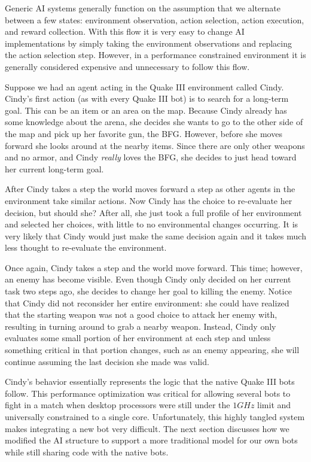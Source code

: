 Generic AI systems generally function on the assumption that we alternate between a few states: environment observation, action selection, action execution, and reward collection. With this flow it is very easy to change AI implementations by simply taking the environment observations and replacing the action selection step. However, in a performance constrained environment it is generally considered expensive and unnecessary to follow this flow.

Suppose we had an agent acting in the Quake III environment called Cindy. Cindy's first action (as with every Quake III bot) is to search for a long-term goal. This can be an item or an area on the map. Because Cindy already has some knowledge about the arena, she decides she wants to go to the other side of the map and pick up her favorite gun, the BFG. However, before she moves forward she looks around at the nearby items. Since there are only other weapons and no armor, and Cindy \emph{really} loves the BFG, she decides to just head toward her current long-term goal.

After Cindy takes a step the world moves forward a step as other agents in the environment take similar actions. Now Cindy has the choice to re-evaluate her decision, but should she? After all, she just took a full profile of her environment and selected her choices, with little to no environmental changes occurring. It is very likely that Cindy would just make the same decision again and it takes much less thought to re-evaluate the environment.

Once again, Cindy takes a step and the world move forward. This time; however, an enemy has become visible. Even though Cindy only decided on her current task two steps ago, she decides to change her goal to killing the enemy. Notice that Cindy did not reconsider her entire environment: she could have realized that the starting weapon was not a good choice to attack her enemy with, resulting in turning around to grab a nearby weapon. Instead, Cindy only evaluates some small portion of her environment at each step and unless something critical in that portion changes, such as an enemy appearing, she will continue assuming the last decision she made was valid.

Cindy's behavior essentially represents the logic that the native Quake III bots follow. This performance optimization was critical for allowing several bots to fight in a match when desktop processors were still under the $1GHz$ limit and universally constrained to a single core. Unfortunately, this highly tangled system makes integrating a new bot very difficult. The next section discusses how we modified the AI structure to support a more traditional model for our own bots while still sharing code with the native bots.

